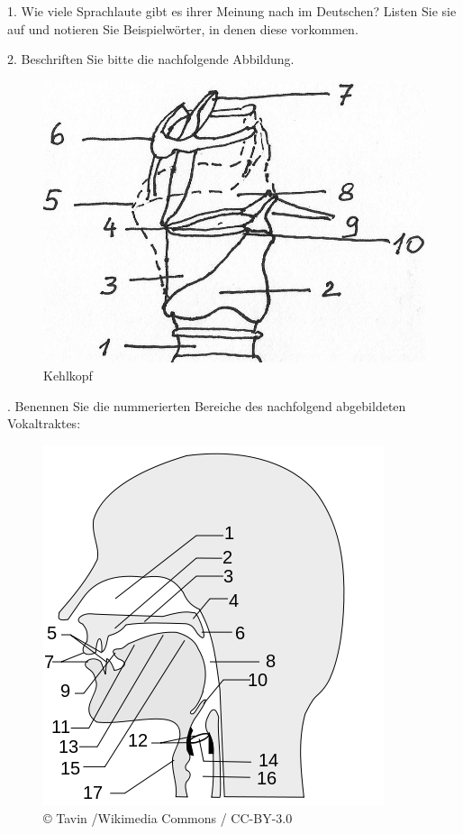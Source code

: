 \documentclass[11pt]{book}
\begin{document}
1.	Wie viele Sprachlaute gibt es ihrer Meinung nach im Deutschen? Listen Sie sie auf und notieren Sie Beispielwörter, in denen diese vorkommen.
\vspace*{7cm}


2. Beschriften Sie bitte die nachfolgende Abbildung.
\begin{figure}[htbp]
\begin{center}
\includegraphics[scale=3]{grafiken/sprechen/kehlkopf}
\caption{Kehlkopf}
\label{fig2}
\end{center}
\end{figure}

.	Benennen Sie die nummerierten Bereiche des nachfolgend abgebildeten Vokaltraktes:
\begin{figure}[htbp]
\begin{center}
\includegraphics[scale=0.6]{grafiken/sprechen/kopf}
\caption{©  Tavin /Wikimedia Commons / CC-BY-3.0}
\label{fig3}
\end{center}
\end{figure}
\end{document}
